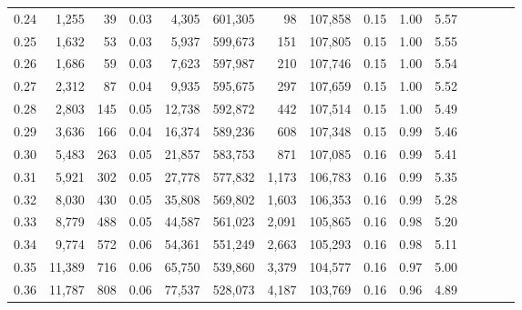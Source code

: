 \begin{tabular}{rrrcrrrrrrrrrrr}
0.24 &   1,255 &     39 &                                       0.03 &    4,305 &  601,305 &       98 &  107,858 &  0.15 &  1.00 &                         5.57 \\
0.25 &   1,632 &     53 &                                       0.03 &    5,937 &  599,673 &      151 &  107,805 &  0.15 &  1.00 &                         5.55 \\
0.26 &   1,686 &     59 &                                       0.03 &    7,623 &  597,987 &      210 &  107,746 &  0.15 &  1.00 &                         5.54 \\
0.27 &   2,312 &     87 &                                       0.04 &    9,935 &  595,675 &      297 &  107,659 &  0.15 &  1.00 &                         5.52 \\
0.28 &   2,803 &    145 &                                       0.05 &   12,738 &  592,872 &      442 &  107,514 &  0.15 &  1.00 &                         5.49 \\
0.29 &   3,636 &    166 &                                       0.04 &   16,374 &  589,236 &      608 &  107,348 &  0.15 &  0.99 &                         5.46 \\
0.30 &   5,483 &    263 &                                       0.05 &   21,857 &  583,753 &      871 &  107,085 &  0.16 &  0.99 &                         5.41 \\
0.31 &   5,921 &    302 &                                       0.05 &   27,778 &  577,832 &    1,173 &  106,783 &  0.16 &  0.99 &                         5.35 \\
0.32 &   8,030 &    430 &                                       0.05 &   35,808 &  569,802 &    1,603 &  106,353 &  0.16 &  0.99 &                         5.28 \\
0.33 &   8,779 &    488 &                                       0.05 &   44,587 &  561,023 &    2,091 &  105,865 &  0.16 &  0.98 &                         5.20 \\
0.34 &   9,774 &    572 &                                       0.06 &   54,361 &  551,249 &    2,663 &  105,293 &  0.16 &  0.98 &                         5.11 \\
0.35 &  11,389 &    716 &                                       0.06 &   65,750 &  539,860 &    3,379 &  104,577 &  0.16 &  0.97 &                         5.00 \\
0.36 &  11,787 &    808 &                                       0.06 &   77,537 &  528,073 &    4,187 &  103,769 &  0.16 &  0.96 &                         4.89 \\

\end{tabular}
